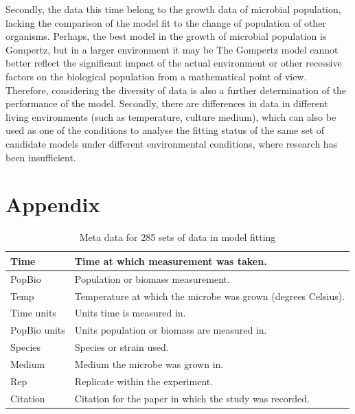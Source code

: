 \documentclass[11pt]{article}
\begin{document}
Secondly, the data this time belong to the growth data of microbial population, lacking the comparison of the model fit to the change of population of other organisms. Perhaps, the best model in the growth of microbial population is Gompertz, but in a larger environment it may be The Gompertz model cannot better reflect the significant impact of the actual environment or other recessive factors on the biological population from a mathematical point of view. Therefore, considering the diversity of data is also a further determination of the performance of the model. Secondly, there are differences in data in different living environments (such as temperature, culture medium), which can also be used as one of the conditions to analyse the fitting status of the same set of candidate models under different environmental conditions, where research has been insufficient.

\newpage
\section{Appendix}

\begin{table}[H]
\caption{Meta data for 285 sets of data in model fitting}
\begin{tabular}{@{}ll@{}}

\toprule
Time          & Time at which measurement was taken.                          \\ \midrule
PopBio        & Population or biomass measurement.                            \\
Temp          & Temperature at which the microbe was grown (degrees Celsius). \\
Time units   & Units time is measured in.                                    \\
PopBio units & Units population or biomass are measured in.                  \\
Species       & Species or strain used.                                       \\
Medium        & Medium the microbe was grown in.                              \\
Rep           & Replicate within the experiment.                              \\
Citation      & Citation for the paper in which the study was recorded.       \\ \bottomrule
\end{tabular}
\end{table}



















\newpage



\end{document}
